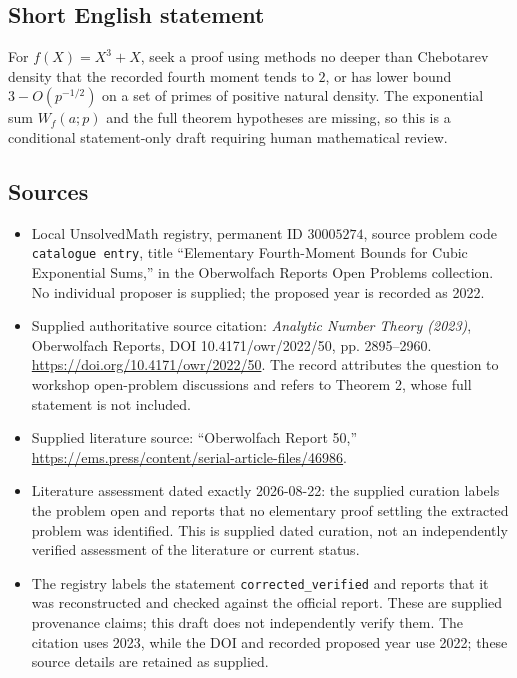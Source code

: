\documentclass[11pt]{article}
\begin{document}
\subsection{Short English statement}
For \(f(X)=X^3+X\), seek a proof using methods no deeper than Chebotarev density that the recorded fourth moment tends to \(2\), or has lower bound \(3-O(p^{-1/2})\) on a set of primes of positive natural density. The exponential sum \(W_f(a;p)\) and the full theorem hypotheses are missing, so this is a conditional statement-only draft requiring human mathematical review.
\subsection{Sources}
\begin{itemize}
\item Local UnsolvedMath registry, permanent ID \(30005274\), source problem code \texttt{catalogue entry}, title ``Elementary Fourth-Moment Bounds for Cubic Exponential Sums,'' in the Oberwolfach Reports Open Problems collection. No individual proposer is supplied; the proposed year is recorded as 2022.
\item Supplied authoritative source citation: \emph{Analytic Number Theory (2023)}, Oberwolfach Reports, DOI 10.4171/owr/2022/50, pp. 2895--2960. \url{https://doi.org/10.4171/owr/2022/50}. The record attributes the question to workshop open-problem discussions and refers to Theorem 2, whose full statement is not included.
\item Supplied literature source: ``Oberwolfach Report 50,'' \url{https://ems.press/content/serial-article-files/46986}.
\item Literature assessment dated exactly 2026-08-22: the supplied curation labels the problem open and reports that no elementary proof settling the extracted problem was identified. This is supplied dated curation, not an independently verified assessment of the literature or current status.
\item The registry labels the statement \texttt{corrected\_verified} and reports that it was reconstructed and checked against the official report. These are supplied provenance claims; this draft does not independently verify them. The citation uses 2023, while the DOI and recorded proposed year use 2022; these source details are retained as supplied.
\end{itemize}
\end{document}
